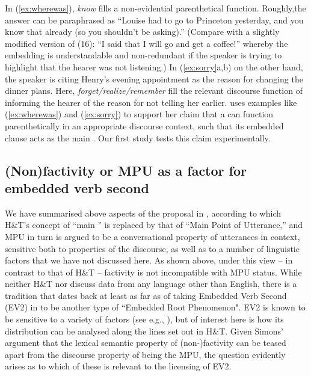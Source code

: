 \documentclass[output=paper]{langsci/langscibook}
\begin{document}
In (\ref{ex:wherewas}), \textit{know} fills a non-evidential parenthetical function. Roughly,\largerpage the answer can be paraphrased as ``Louise had to go to Princeton yesterday, and you know that already (so you shouldn't be asking).'' (Compare with a slightly modified version of (16): ``I said that I will go and get a coffee!'' whereby the embedding is understandable and non-redundant if the speaker is trying to highlight that the hearer was not listening.)
In (\ref{ex:sorry}a,b) on the other hand, the speaker is citing Henry's evening appointment as the reason for changing the dinner plans. Here, \textit{forget/realize/remember}  fill the relevant discourse function of informing the hearer of the reason for not telling her earlier. \citeauthor{Simons2007} uses examples like (\ref{ex:wherewas}) and (\ref{ex:sorry}) to support her claim that a  can function parenthetically in an appropriate discourse context, such that its embedded clause acts as the main . Our first study tests this claim experimentally.

\subsection{(Non)factivity or MPU as a factor for embedded verb second}\label{nonfactivityOrMPU}

We have summarised above aspects of the proposal in \cite{Simons2007}, according to which H\&T's concept of ``main '' is replaced by that of ``Main Point of Utterance,'' and MPU in turn is argued to be a conversational property of utterances in context, sensitive both to properties of the discourse, as well as to a number of linguistic factors that we have not discussed here.  As shown above, under this view -- in contrast to that of H\&T -- factivity is not incompatible with MPU status.  %
While neither H\&T nor \citeauthor{Simons2007} discuss data from any language other than English, there is a tradition that dates back at least as far as \citet{Andersson1975} of taking Embedded Verb Second (EV2) in  to be another type of ``Embedded Root Phenomenon".  EV2 is known to be sensitive to a variety of factors (see e.g., \citealt{Zwart1997}), but of interest here is how its distribution can be analysed along the lines set out in H\&T. Given Simons' argument that the lexical semantic property of (non-)factivity can be teased apart from the discourse  property of being the MPU,  the {question} evidently arises as to which of these is relevant to the licensing of EV2.
\end{document}
